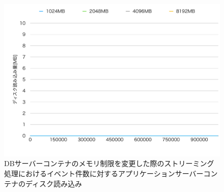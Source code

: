 \documentclass[../../../../../main]{subfiles}
\begin{document}
    \begin{figure}[H]
        \centering
        \includegraphics[width=12cm]{graph}
        \caption{DBサーバーコンテナのメモリ制限を変更した際のストリーミング処理におけるイベント件数に対するアプリケーションサーバーコンテナのディスク読み込み}
        \label{fig:stream-change-db-memory-limit-app-disk-out-app_4_8192-db_400}
    \end{figure}
\end{document}
